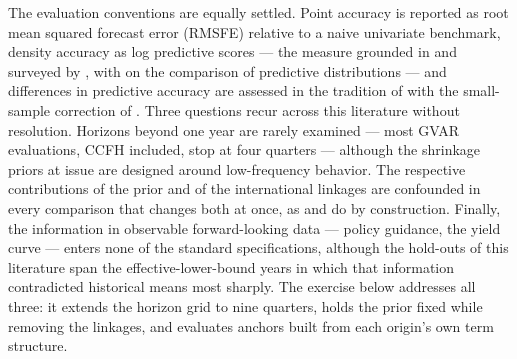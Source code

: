 The evaluation conventions are equally settled. Point accuracy is reported as root mean
squared forecast error (RMSFE) relative to a naive univariate benchmark, density accuracy as log
predictive scores --- the measure grounded in \citet{Geweke2001} and surveyed by
\citet{GewekeWhiteman2006}, with \citet{GewekeAmisano2010} on the comparison of
predictive distributions --- and differences in predictive accuracy are
assessed in the tradition of \citet{DieboldMariano1995} with the small-sample correction
of \citet{HarveyLeybourneNewbold1997}. Three questions recur across this literature
without resolution. Horizons beyond one year are rarely examined --- most GVAR
evaluations, CCFH included, stop at four quarters --- although the shrinkage priors at
issue are designed around low-frequency behavior. The respective contributions of the
prior and of the international linkages are confounded in every comparison that changes
both at once, as \citet{PesaranSchuermannSmith2009} and
\citet{CrespoFeldkircherHuber2016} do by construction. Finally, the information in
observable forward-looking data --- policy guidance, the yield curve --- enters none of
the standard specifications, although the hold-outs of this literature span the
effective-lower-bound years in which that information contradicted historical means most
sharply. The exercise below addresses all three: it extends the horizon grid to nine
quarters, holds the prior fixed while removing the linkages, and evaluates anchors built
from each origin's own term structure.


